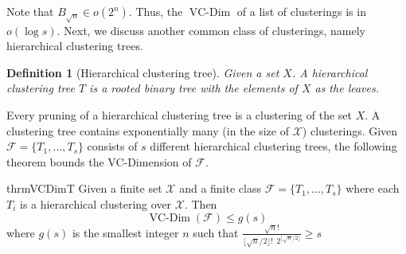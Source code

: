 \documentclass[12pt]{article}
\newtheorem{definition}[theorem]{Definition}
\newcommand{\mc}{\mathcal}
\DeclareMathOperator*{\vcdim}{VC-Dim}
\begin{document}
\noindent Note that $B_{\sqrt n} \in o(2^{n})$. Thus, the $\vcdim$ of a list of clusterings is in $o( \log s)$. Next, we discuss another common class of clusterings, namely hierarchical clustering trees. 

\begin{definition}[Hierarchical clustering tree]
Given a set $X$. A hierarchical clustering tree $T$ is a rooted binary tree with the elements of $X$ as the leaves. 
\end{definition}

\noindent Every pruning of a hierarchical clustering tree is a clustering of the set $X$. A clustering tree contains exponentially many (in the size of $\mc X$) clusterings. Given $\mc F = \{T_1, \ldots, T_s\}$ consists of $s$ different hierarchical clustering trees, the following theorem bounds the VC-Dimension of ${\mc F}$.

\begin{restatable}{thrm}{VCDimT}
Given a finite set $\mc X$ and a finite class $\mc F = \{T_1, \ldots, T_s\}$ where each $T_i$ is a hierarchical clustering over $\mc X$. Then 
$$\vcdim({\mc F}) \le g(s)$$ where $g(s)$ is the smallest integer $n$ such that $\frac{\sqrt n!}{\lfloor \sqrt n/2 \rfloor! \enspace 2^{\lfloor \sqrt n/2 \rfloor}} \ge s $
\end{restatable}
\end{document}
